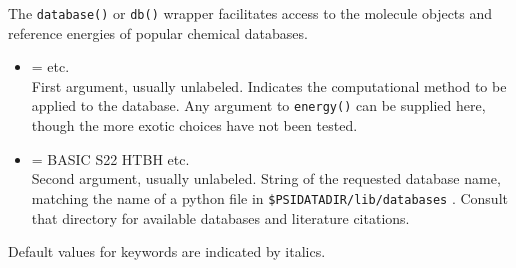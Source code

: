 The \texttt{database()} or \texttt{db()} wrapper facilitates access to
the molecule objects and reference energies of popular chemical databases.

\begin{itemize}
\item {} =  \textbar\;  \textbar\;  \textbar\; etc. \\
First argument, usually unlabeled. Indicates the computational method to be applied to the database.
Any argument to \texttt{energy()} can be supplied here, though the more exotic choices have not been tested.

\item {} = \textsf{\qq BASIC\qq} \textbar\; \textsf{\qq S22\qq} \textbar\; \textsf{\qq HTBH\qq} \textbar\; etc. \\

Second argument, usually unlabeled. String of the requested database name, matching the name of a
python file in \texttt{\$PSIDATADIR/lib/databases} . Consult that directory for available databases
and literature citations.
\end{itemize}



Default values for keywords are indicated by italics.


